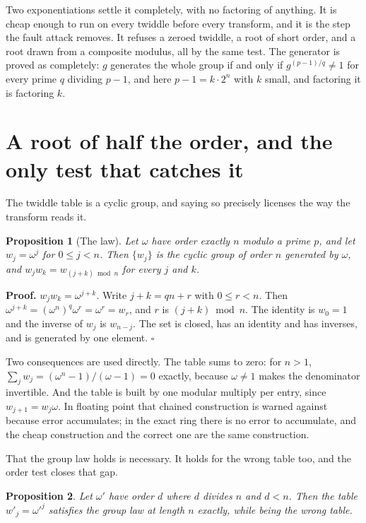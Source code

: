 \documentclass{article}
\newtheorem{proposition}{Proposition}
\begin{document}
Two exponentiations settle it completely, with no factoring of anything. It is cheap enough to run on every twiddle before every transform, and it is the step the fault attack removes. It refuses a zeroed twiddle, a root of short order, and a root drawn from a composite modulus, all by the same test. The generator is proved as completely: \(g\) generates the whole group if and only if \(g^{(p-1)/q} \ne 1\) for every prime \(q\) dividing \(p-1\), and here \(p - 1 = k \cdot 2^n\) with \(k\) small, and factoring it is factoring \(k\).

\section{A root of half the order, and the only test that catches it}

The twiddle table is a cyclic group, and saying so precisely licenses the way the transform reads it.

\begin{proposition}[The law]
Let \(\omega\) have order exactly \(n\) modulo a prime \(p\), and let \(w_j = \omega^j\) for \(0 \le j < n\). Then \(\{w_j\}\) is the cyclic group of order \(n\) generated by \(\omega\), and \(w_j w_k = w_{(j+k) \bmod n}\) for every \(j\) and \(k\).
\end{proposition}

\textbf{Proof.} \(w_j w_k = \omega^{j+k}\). Write \(j + k = qn + r\) with \(0 \le r < n\). Then \(\omega^{j+k} = (\omega^n)^q \omega^r = \omega^r = w_r\), and \(r\) is \((j+k) \bmod n\). The identity is \(w_0 = 1\) and the inverse of \(w_j\) is \(w_{n-j}\). The set is closed, has an identity and has inverses, and is generated by one element. \(\square\)

Two consequences are used directly. The table sums to zero: for \(n > 1\), \(\sum_j w_j = (\omega^n - 1)/(\omega - 1) = 0\) exactly, because \(\omega \ne 1\) makes the denominator invertible. And the table is built by one modular multiply per entry, since \(w_{j+1} = w_j \omega\). In floating point that chained construction is warned against because error accumulates; in the exact ring there is no error to accumulate, and the cheap construction and the correct one are the same construction.

That the group law holds is necessary. It holds for the wrong table too, and the order test closes that gap.

\begin{proposition}
Let \(\omega'\) have order \(d\) where \(d\) divides \(n\) and \(d < n\). Then the table \(w'_j = \omega'^j\) satisfies the group law at length \(n\) exactly, while being the wrong table.
\end{proposition}
\end{document}
